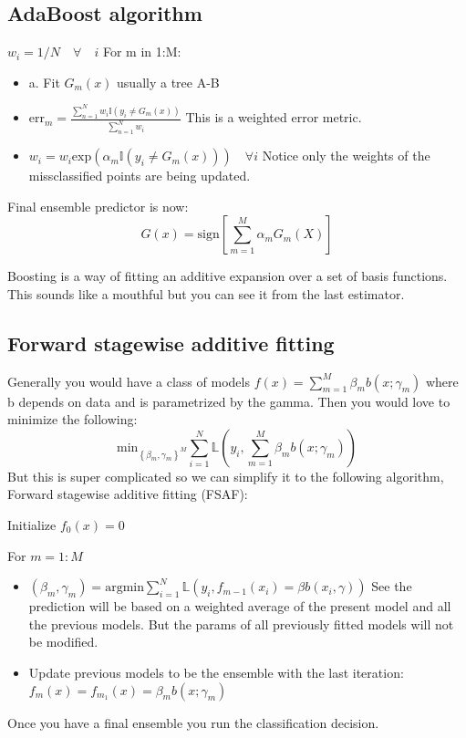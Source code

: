 \documentclass{article}
\begin{document}
\subsection*{AdaBoost algorithm}
$w_i = 1/N \quad \forall \quad i$
For m in 1:M:
\begin{itemize}
    \item a. Fit $G_m(x)$ usually a tree A-B 
    \item $\text{err}_m = \frac{\sum_{n = 1}^{N} w_i \mathbb{I}(y_i \neq G_m(x))}{\sum_{n = 1}^{N} w_i}$ 
    This is a weighted error metric.
    \item $w_i = w_i \text{exp}(\alpha_m \mathbb{I}(y_i \neq G_m(x))) \quad \forall i$ Notice only the weights of the missclassified points are 
    being updated.

\end{itemize}
Final ensemble predictor is now: $$G(x) = \text{sign}[\sum_{m = 1}^{M} \alpha_m G_m (X)]$$        

Boosting is a way of fitting an additive expansion over a set of basis functions. This sounds like a mouthful but you can see it from the last estimator. 

\subsection*{Forward stagewise additive fitting}
Generally you would have a class of models $f(x) = \sum_{m = 1}^{M} \beta_m b(x;\gamma_m)$ where b depends on data and is parametrized by the gamma.
Then you would love to minimize the following:
$$\text{min}_{\left\{\beta_m, \gamma_m\right\}^M } \sum_{i = 1}^{N} \mathbb{L} (y_i, \sum_{m = 1}^{M} \beta_m b(x;\gamma_m))  $$
But this is super complicated so we can simplify it to the following algorithm, Forward stagewise additive fitting (FSAF):

Initialize $f_0(x) = 0$

For $m = 1:M$
\begin{itemize}
    \item $(\beta_m,\gamma_m) = \text{argmin}\sum_{i = 1}^{N}  \mathbb{L}(y_i, f_{m-1}(x_i) = \beta b(x_i,\gamma)) $ See the prediction will be based on a 
    weighted average of the present model and all the previous models. But the params of all previously fitted models will not be modified.
    \item Update previous models to be the ensemble with the last iteration: $f_m(x) = f_{m_1}(x) = \beta_m b(x;\gamma_m)$
\end{itemize}
Once you have a final ensemble you run the classification decision.
\end{document}
